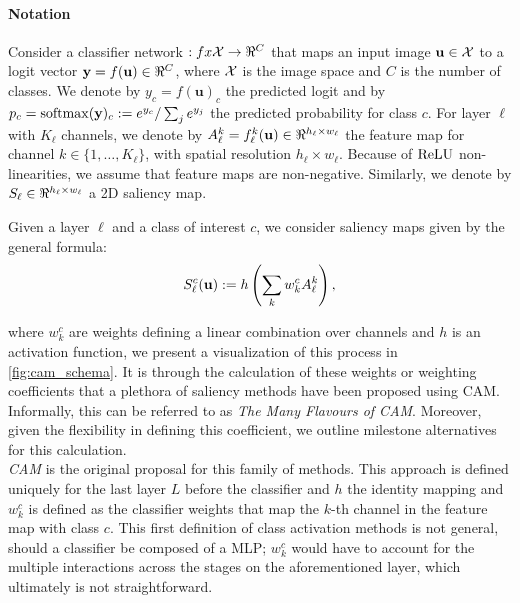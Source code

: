 \paragraph{Notation}
\label{sec:oc_notation}
Consider a classifier network $:fx \cX \to \real^C$ that maps an input image $\mathbf{u} \in \mathcal{X}$ to a 
logit vector $\vy = f(\mathbf{u}) \in \real^C$, where $\mathcal{X}$ is the image space and $C$ is the number 
of classes. We denote by $y_c = f(\mathbf{u})_c$ the predicted logit and by $p_c = \operatorname{softmax}(\mathbf{y})_c 
\mathrel{:=} e^{y_c} / \sum_j e^{y_j}$ the predicted probability for class $c$. For layer $\ell$ 
with $K_\ell$ channels, we denote by $A^k_\ell = f^k_\ell(\mathbf{u}) \in \real^{h_\ell \times w_\ell}$ 
the feature map for channel $k \in \{1,\dots,K_\ell\}$, with spatial resolution $h_\ell \times 
w_\ell$. Because of ${\operatorname{ReLU}}$ non-linearities, we assume that feature maps are non-negative. 
Similarly, we denote by $S_\ell \in \real^{h_\ell \times w_\ell}$ a 2D saliency map.

\label{sec:oc_back}
Given a layer $\ell$ and a class of interest $c$, we consider saliency maps given by the general 
formula: \\

\begin{equation}
	S^c_\ell(\mathbf{u}) \mathrel{:=} h \left( \sum_k w^c_k A^k_\ell \right),
\label{eq:sal}
\end{equation}

where $w^c_k$ are weights defining a linear combination over channels and $h$ is an activation 
function, we present a visualization of this process in \autoref{fig:cam_schema}. It is through the 
calculation of these weights or weighting coefficients that a plethora of saliency methods have 
been proposed using CAM. Informally, this can be referred to as \emph{The Many Flavours of CAM}.
Moreover, given the flexibility in defining this coefficient, we outline milestone alternatives for 
this calculation.\\



\noindent \emph{CAM} \autocite{zhou2016learning} is the original proposal for this family of 
methods. This approach is defined uniquely for the last layer $L$ before the classifier and $h$ the 
identity mapping and $w^c_k$ is defined as the classifier weights that map the $k$-th channel in 
the feature map with class $c$. This first definition of class activation methods is not general, 
should a classifier be composed of a MLP; $w^c_k$ would have to account for the multiple 
interactions across the stages on the aforementioned layer, which ultimately is not 
straightforward. \\
 
